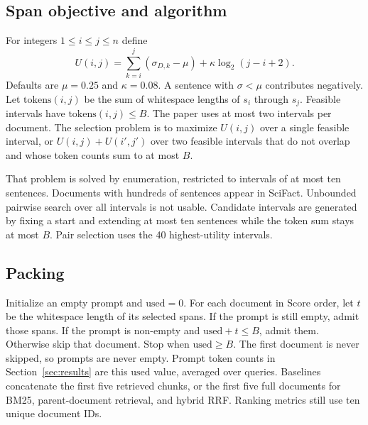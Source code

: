 \documentclass[preprint,12pt,authoryear]{elsarticle}
\begin{document}
\subsection{Span objective and algorithm}
For integers \(1\le i\le j\le n\) define
\begin{equation}
U(i,j)=\sum_{k=i}^{j}(\sigma_{D,k}-\mu)+\kappa\log_2(j-i+2).
\end{equation}
Defaults are \(\mu=0.25\) and \(\kappa=0.08\). A sentence with \(\sigma<\mu\) contributes negatively. Let \(\mathrm{tokens}(i,j)\) be the sum of whitespace lengths of \(s_i\) through \(s_j\). Feasible intervals have \(\mathrm{tokens}(i,j)\le B\). The paper uses at most two intervals per document. The selection problem is to maximize \(U(i,j)\) over a single feasible interval, or \(U(i,j)+U(i',j')\) over two feasible intervals that do not overlap and whose token counts sum to at most \(B\).

That problem is solved by enumeration, restricted to intervals of at most ten sentences. Documents with hundreds of sentences appear in SciFact. Unbounded pairwise search over all intervals is not usable. Candidate intervals are generated by fixing a start and extending at most ten sentences while the token sum stays at most \(B\). Pair selection uses the 40 highest-utility intervals.

\subsection{Packing}
Initialize an empty prompt and \(\mathrm{used}=0\). For each document in Score order, let \(t\) be the whitespace length of its selected spans. If the prompt is still empty, admit those spans. If the prompt is non-empty and \(\mathrm{used}+t\le B\), admit them. Otherwise skip that document. Stop when \(\mathrm{used}\ge B\). The first document is never skipped, so prompts are never empty. Prompt token counts in Section~\ref{sec:results} are this \(\mathrm{used}\) value, averaged over queries. Baselines concatenate the first five retrieved chunks, or the first five full documents for BM25, parent-document retrieval, and hybrid RRF. Ranking metrics still use ten unique document IDs.
\end{document}
